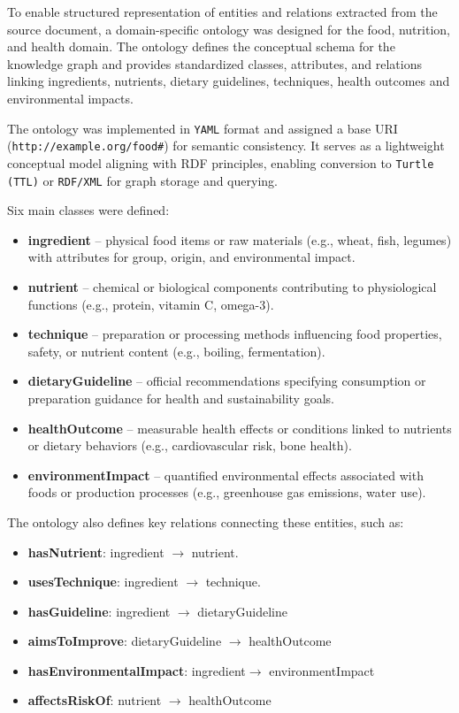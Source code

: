 To enable structured representation of entities and relations extracted from the source document, a domain-specific ontology was designed for the food, nutrition, and health domain. The ontology defines the conceptual schema for the knowledge graph and provides standardized classes, attributes, and relations linking ingredients, nutrients, dietary guidelines, techniques, health outcomes and environmental impacts.

The ontology was implemented in \texttt{YAML} format and assigned a base URI (\texttt{http://example.org/food\#}) for semantic consistency. It serves as a lightweight conceptual model aligning with RDF principles, enabling conversion to \texttt{Turtle (TTL)} or \texttt{RDF/XML} for graph storage and querying.

Six main classes were defined:
\begin{itemize}
    \item \textbf{ingredient} – physical food items or raw materials (e.g., wheat, fish, legumes) with attributes for group, origin, and environmental impact.
    \item \textbf{nutrient} – chemical or biological components contributing to physiological functions (e.g., protein, vitamin C, omega-3).
    \item \textbf{technique} – preparation or processing methods influencing food properties, safety, or nutrient content (e.g., boiling, fermentation).
    \item \textbf{dietaryGuideline} – official recommendations specifying consumption or preparation guidance for health and sustainability goals.
    \item \textbf{healthOutcome} – measurable health effects or conditions linked to nutrients or dietary behaviors (e.g., cardiovascular risk, bone health).
    \item \textbf{environmentImpact} – quantified environmental effects associated with foods or production processes (e.g., greenhouse gas emissions, water use).
\end{itemize}

The ontology also defines key relations connecting these entities, such as:
\begin{itemize}
    \item \textbf{hasNutrient}: ingredient $\rightarrow$ nutrient.
    \item \textbf{usesTechnique}: ingredient $\rightarrow$ technique.
    \item \textbf{hasGuideline}: ingredient $\rightarrow$ dietaryGuideline
    \item \textbf{aimsToImprove}: dietaryGuideline $\rightarrow$ healthOutcome
    \item \textbf{hasEnvironmentalImpact}: ingredient$\rightarrow$ environmentImpact
    \item \textbf{affectsRiskOf}: nutrient $\rightarrow$ healthOutcome
\end{itemize}

